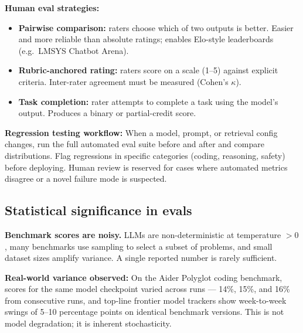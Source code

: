 \textbf{Human eval strategies:}
\begin{itemize}
  \item \textbf{Pairwise comparison:} raters choose which of two outputs is better.
    Easier and more reliable than absolute ratings; enables Elo-style leaderboards
    (e.g.\ LMSYS Chatbot Arena).
  \item \textbf{Rubric-anchored rating:} raters score on a scale (1--5) against
    explicit criteria. Inter-rater agreement must be measured (Cohen's $\kappa$).
  \item \textbf{Task completion:} rater attempts to complete a task using the model's
    output. Produces a binary or partial-credit score.
\end{itemize}

\textbf{Regression testing workflow:}
When a model, prompt, or retrieval config changes, run the full automated eval suite
before and after and compare distributions. Flag regressions in specific categories
(coding, reasoning, safety) before deploying. Human review is reserved for cases
where automated metrics disagree or a novel failure mode is suspected.

\subsection{Statistical significance in evals}

\textbf{Benchmark scores are noisy.} LLMs are non-deterministic at temperature $> 0$,
many benchmarks use sampling to select a subset of problems, and small dataset sizes
amplify variance. A single reported number is rarely sufficient.

\textbf{Real-world variance observed:} On the Aider Polyglot coding benchmark, scores
for the same model checkpoint varied across runs --- 14\%, 15\%, and 16\% from
consecutive runs, and top-line frontier model trackers show week-to-week swings of
5--10 percentage points on identical benchmark versions. This is not model degradation;
it is inherent stochasticity.

